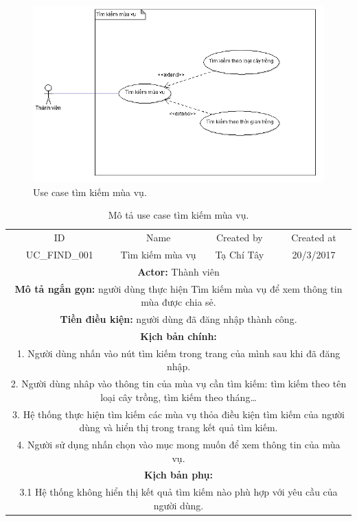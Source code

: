 \documentclass[a4paper,12pt,oneside]{article}
\begin{document}
\begin{figure}[htp]
\centering
\includegraphics[scale=.9]{hinh/TimKiemMuaVu.png}
\caption{Use case tìm kiếm mùa vụ.}
\end{figure}

\begin{table}[!htp]
\centering
\begin{tabularx}{\linewidth}{ |c||c|c|c| }
\hline
ID & Name & Created by & Created at\\
UC\_FIND\_001 & Tìm kiếm mùa vụ & Tạ Chí Tây & 20/3/2017\\
\hline
\multicolumn{4}{|X|}{\textbf{Actor:} Thành viên }\\
\hline
\multicolumn{4}{|X|}{\textbf{Mô tả ngắn gọn:} người dùng thực hiện Tìm kiếm mùa vụ để xem thông tin mùa được chia sẻ. }\\
\hline
\multicolumn{4}{|X|}{\textbf{Tiền điều kiện:} người dùng đã đăng nhập thành công.}\\
\hline
\multicolumn{4}{|X|}{\textbf{Kịch bản chính:}}\\
\multicolumn{4}{|X|}{ 
1. Người dùng nhấn vào nút tìm kiếm trong trang của mình sau khi đã đăng nhập.}\\
\multicolumn{4}{|X|}{ 
2.	Người dùng nhâp vào thông tin của mùa vụ cần tìm kiếm: tìm kiếm theo tên loại cây trồng, tìm kiếm theo tháng…}\\
\multicolumn{4}{|X|}{
3. Hệ thống thực hiện tìm kiếm các mùa vụ thỏa điều kiện tìm kiếm của người dùng và hiển thị trong trang kết quả tìm kiếm.}\\
\multicolumn{4}{|X|}{
4.	Người sử dụng nhấn chọn vào mục mong muốn để xem thông tin của mùa vụ.}\\
\hline
\multicolumn{4}{|X|}{\textbf{Kịch bản phụ:}}\\
\multicolumn{4}{|X|}{3.1	Hệ thống không hiển thị kết quả tìm kiếm nào phù hợp với yêu cầu của người dùng.}\\
\hline
\end{tabularx}
\caption{Mô tả use case tìm kiếm mùa vụ.}
\end{table}
\end{document}
